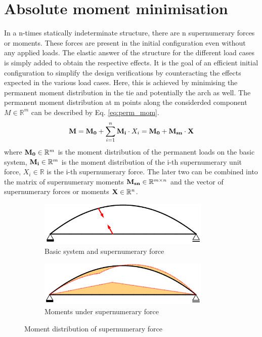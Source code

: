 \section{Absolute moment minimisation} \label{app:moment_min}
In a n-times statically indeterminate structure, there are n supernumerary forces or moments. These forces are present in the initial configuration even without any applied loads. The elastic answer of the structure for the different load cases is simply added to obtain the respective effects. It is the goal of an efficient initial configuration to simplify the design verifications by counteracting the effects expected in the various load cases. Here, this is achieved by minimising the permanent moment distribution in the tie and potentially the arch as well. The permanent moment distribution at m points along the considerded component $M \in \mathbb{R}^m$ can be described by Eq. \eqref{eq:perm_mom}. 
\begin{equation}
    {\bf M} = {\bf M_0} + \sum_{i=1}^{n} {\bf M_i} \cdot X_i = {\bf M_0} + {\bf M_{sn}} \cdot {\bf X}
    \label{eq:perm_mom}
\end{equation}
where ${\bf M_0} \in \mathbb{R}^m$ is the moment distribution of the permanent loads on the basic system, ${\bf M_i} \in \mathbb{R}^m$ is the moment distribution of the i-th supernumerary unit force, ${X_i} \in \mathbb{R}$ is the i-th supernumerary force. The later two can be combined into the matrix of supernumerary moments ${\bf M_{sn}} \in  \mathbb{R}^{m\times n}$ and the vector of supernumerary forces or moments ${\bf X} \in \mathbb{R}^n$.

\begin{figure}[H]
\centering
\begin{subfigure}{0.5\textwidth}
    \centering
    \includegraphics[trim={0 0cm 0 0},clip, width=0.9\textwidth]{overleaf/Appendix/Pictures/min_1.PNG}
    \caption{Basic system and supernumerary force}
    \label{fig:Minimisation_1}
\end{subfigure}%
\begin{subfigure}{.5\textwidth}
    \centering
    \includegraphics[trim={0 0cm 0 0},clip, width=0.9\textwidth]{overleaf/Appendix/Pictures/min_2.PNG}
    \caption{Moments under supernumerary force}
    \label{fig:Minimisation_2}
\end{subfigure}
\caption{Moment distribution of supernumerary force}
\label{fig:Minimisation}
\end{figure}

